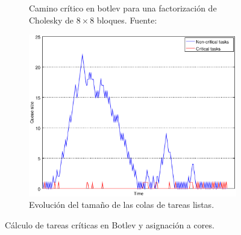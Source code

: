 \begin{figure}
  \centering
  
  \begin{subfigure}{.45\textwidth}
    \centering
    \setlength{\fboxsep}{5pt}
    \caption[Camino crítico en botlev para una factorización de Cholesky de
      $8\times8$ bloques]{Camino crítico en botlev para una factorización de Cholesky de
      $8\times8$ bloques. Fuente:~\cite{botlev}}
    \label{s3:fig:botlev_tdg}
  \end{subfigure}
  \begin{subfigure}{.47\textwidth}
    \centering
    \includegraphics[width=1\linewidth]{Figures/botlev-colas.eps}
    \caption{Evolución del tamaño de las colas de tareas
      listas.}
    \label{s3:fig:botlev_colas}
  \end{subfigure}  
  
  \caption{Cálculo de tareas críticas en Botlev y asignación a cores.}
  \label{s3:fig:botlev}
\end{figure}

